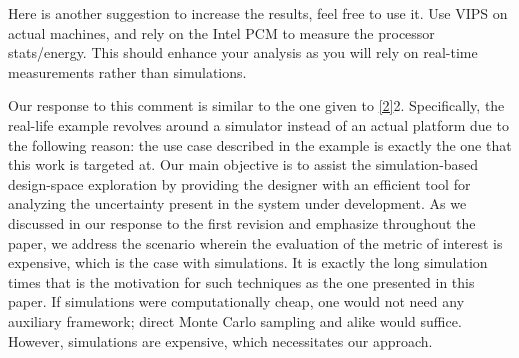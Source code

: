 \begin{reviewer}
Here is another suggestion to increase the results, feel free to use it. Use
VIPS on actual machines, and rely on the Intel PCM to measure the processor
stats/energy. This should enhance your analysis as you will rely on real-time
measurements rather than simulations.
\end{reviewer}

\begin{authors}
Our response to this comment is similar to the one given to \cref{2}{2}.
Specifically, the real-life example revolves around a simulator instead of an
actual platform due to the following reason: the use case described in the
example is exactly the one that this work is targeted at. Our main objective is
to assist the simulation-based design-space exploration by providing the
designer with an efficient tool for analyzing the uncertainty present in the
system under development. As we discussed in our response to the first revision
and emphasize throughout the paper, we address the scenario wherein the
evaluation of the metric of interest is expensive, which is the case with
simulations. It is exactly the long simulation times that is the motivation for
such techniques as the one presented in this paper. If simulations were
computationally cheap, one would not need any auxiliary framework; direct Monte
Carlo sampling and alike would suffice. However, simulations are expensive,
which necessitates our approach.
\end{authors}

